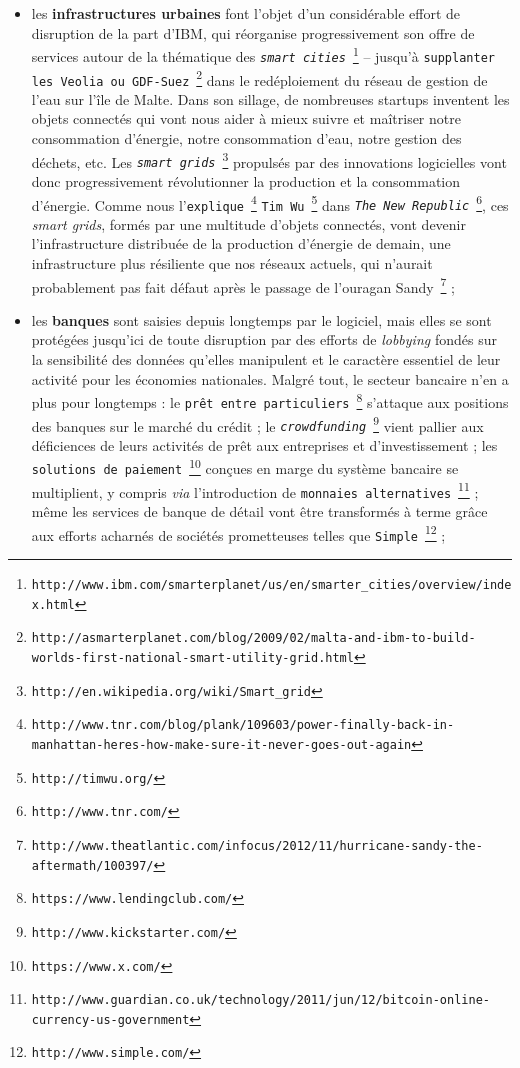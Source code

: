 \documentclass[11pt,twoside,a4paper]{article}
\begin{document}
\begin{itemize}
	\item les \textbf{infrastructures urbaines} font l'objet d'un consid{\'e}rable effort de disruption de la part d'IBM, qui r{\'e}organise progressivement son offre de services autour de la th{\'e}matique des \texttt{\emph{smart cities}}~\footnote{\texttt{http://www.ibm.com/smarterplanet/us/en/smarter\_cities/overview/index.html}} -- jusqu'{\`a} \texttt{supplanter les Veolia ou GDF-Suez}~\footnote{\texttt{http://asmarterplanet.com/blog/2009/02/malta-and-ibm-to-build-worlds-first-national-smart-utility-grid.html}} dans le red{\'e}ploiement du r{\'e}seau de gestion de l'eau sur l'{\^i}le de Malte. Dans son sillage, de nombreuses startups inventent les objets connect{\'e}s qui vont nous aider {\`a} mieux suivre et ma{\^i}triser notre consommation d'{\'e}nergie, notre consommation d'eau, notre gestion des d{\'e}chets, etc. Les \texttt{\emph{smart grids}}~\footnote{\texttt{http://en.wikipedia.org/wiki/Smart\_grid}} propuls{\'e}s par des innovations logicielles vont donc progressivement r{\'e}volutionner la production et la consommation d'{\'e}nergie. Comme nous l'\texttt{explique}~\footnote{\texttt{http://www.tnr.com/blog/plank/109603/power-finally-back-in-manhattan-heres-how-make-sure-it-never-goes-out-again}} \texttt{Tim Wu}~\footnote{\texttt{http://timwu.org/}} dans \texttt{\emph{The New Republic}}~\footnote{\texttt{http://www.tnr.com/}}, ces \emph{smart grids}, form{\'e}s par une multitude d'objets connect{\'e}s, vont devenir l'infrastructure distribu{\'e}e de la production d'{\'e}nergie de demain, une infrastructure plus r{\'e}siliente que nos r{\'e}seaux actuels, qui n'aurait probablement pas fait d{\'e}faut apr{\`e}s le passage de l'ouragan Sandy~\footnote{\texttt{http://www.theatlantic.com/infocus/2012/11/hurricane-sandy-the-aftermath/100397/}} ;
	\item les \textbf{banques} sont saisies depuis longtemps par le logiciel, mais elles se sont prot{\'e}g{\'e}es jusqu'ici de toute disruption par des efforts de \emph{lobbying} fond{\'e}s sur la sensibilit{\'e} des donn{\'e}es qu'elles manipulent et le caract{\`e}re essentiel de leur activit{\'e} pour les {\'e}conomies nationales. Malgr{\'e} tout, le secteur bancaire n'en a plus pour longtemps : le \texttt{pr{\^e}t entre particuliers}~\footnote{\texttt{https://www.lendingclub.com/}} s'attaque aux positions des banques sur le march{\'e} du cr{\'e}dit ; le \texttt{\emph{crowdfunding}}~\footnote{\texttt{http://www.kickstarter.com/}} vient pallier aux d{\'e}ficiences de leurs activit{\'e}s de pr{\^e}t aux entreprises et d'investissement ; les \texttt{solutions de paiement}~\footnote{\texttt{https://www.x.com/}} con\c{c}ues en marge du syst{\`e}me bancaire se multiplient, y compris \emph{via} l'introduction de \texttt{monnaies alternatives}~\footnote{\texttt{http://www.guardian.co.uk/technology/2011/jun/12/bitcoin-online-currency-us-government}} ; m{\^e}me les services de banque de d{\'e}tail vont {\^e}tre transform{\'e}s {\`a} terme gr{\^a}ce aux efforts acharn{\'e}s de soci{\'e}t{\'e}s prometteuses telles que \texttt{Simple}~\footnote{\texttt{http://www.simple.com/}} ;

\end{itemize}
\end{document}
